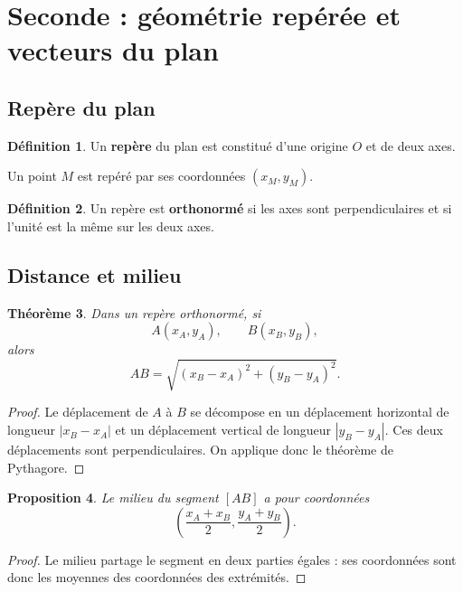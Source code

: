 \documentclass[11pt,a4paper]{article}
\theoremstyle{definition}
\newtheorem{definition}{Définition}[section]
\theoremstyle{plain}
\newtheorem{proposition}[definition]{Proposition}
\newtheorem{theoreme}[definition]{Théorème}
\begin{document}
\section{Seconde : géométrie repérée et vecteurs du plan}

\subsection{Repère du plan}

\begin{definition}
Un \textbf{repère} du plan est constitué d'une origine $O$ et de deux axes.

Un point $M$ est repéré par ses coordonnées $(x_M,y_M)$.
\end{definition}

\begin{definition}
Un repère est \textbf{orthonormé} si les axes sont perpendiculaires et si l'unité est la même sur les deux axes.
\end{definition}

\subsection{Distance et milieu}

\begin{theoreme}
Dans un repère orthonormé, si
\[
A(x_A,y_A),\qquad B(x_B,y_B),
\]
alors
\[
AB=\sqrt{(x_B-x_A)^2+(y_B-y_A)^2}.
\]
\end{theoreme}

\begin{proof}
Le déplacement de $A$ à $B$ se décompose en un déplacement horizontal de longueur $|x_B-x_A|$ et un déplacement vertical de longueur $|y_B-y_A|$.
Ces deux déplacements sont perpendiculaires.
On applique donc le théorème de Pythagore.
\end{proof}

\begin{proposition}
Le milieu du segment $[AB]$ a pour coordonnées
\[
\left(\frac{x_A+x_B}{2},\frac{y_A+y_B}{2}\right).
\]
\end{proposition}

\begin{proof}
Le milieu partage le segment en deux parties égales : ses coordonnées sont donc les moyennes des coordonnées des extrémités.
\end{proof}
\end{document}
